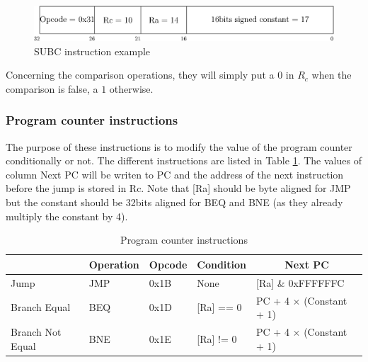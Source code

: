\begin{figure}[H]
    \centering
    \includegraphics[scale=0.6]{Chapter3-CPU/res/instruction_subc}
    \caption{SUBC instruction example}
    \label{fig:instructions/subc}
\end{figure}

Concerning the comparison operations, they will simply put a $0$ in $R_c$ when the comparison is 
false, a $1$ otherwise.

\subsubsection*{Program counter instructions}

The purpose of these instructions is to modify the value of the program counter conditionally or 
not. The different instructions are listed in Table \ref{tab:instruction/pc}. The values of 
column Next PC will be writen to PC and the address of the next instruction before the jump is
stored in Rc. Note that [Ra] should be byte aligned for JMP but the constant should be 32bits 
aligned for BEQ and BNE (as they already multiply the constant by 4).

\begin{table}[H]
    \centering
    \begin{tabular}{|l|l|l|l|l|}
    \hline
    \rowcolor[HTML]{DAE8FC} 
    \multicolumn{1}{|c|}{\cellcolor[HTML]{DAE8FC}\textbf{Name}} & \multicolumn{1}{c|}{\cellcolor[HTML]{DAE8FC}\textbf{Operation}} & \multicolumn{1}{c|}{\cellcolor[HTML]{DAE8FC}\textbf{Opcode}} & \multicolumn{1}{c|}{\cellcolor[HTML]{DAE8FC}\textbf{Condition}} & \multicolumn{1}{c|}{\cellcolor[HTML]{DAE8FC}\textbf{Next PC}} \\ \hline
    Jump                                                        & JMP                                                             & 0x1B                                                         & None                                                                 & {[}Ra{]} \& 0xFFFFFFC                                         \\ \hline
    Branch Equal                                                & BEQ                                                             & 0x1D                                                         & {[}Ra{]} == 0                                                        & PC + 4 $\times$ (Constant + 1)             \\ \hline
    Branch Not Equal                                            & BNE                                                             & 0x1E                                                         & {[}Ra{]} != 0                                                        & PC + 4 $\times$ (Constant + 1)                \\ \hline
    \end{tabular}
    \caption{Program counter instructions}
    \label{tab:instruction/pc}
\end{table}

